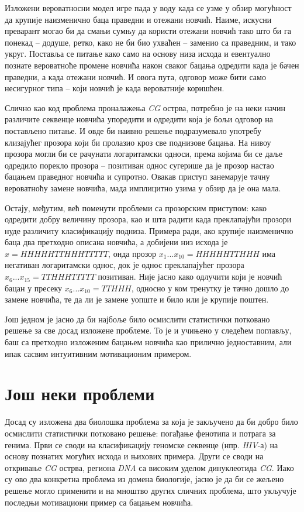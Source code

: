 \documentclass[12pt,oneside]{memoir}
\begin{document}
\begin{CJK}{UTF8}{ipxm}
Изложени вероватносни модел игре пада у воду када се узме у обзир могућност да крупије наизменично баца праведни и отежани новчић. Наиме, искусни преварант могао би да смањи сумњу да користи отежани новчић тако што би га понекад -- додуше, ретко, како не би био ухваћен -- заменио са праведним, и тако укруг. Поставља се питање како само на основу низа исхода и евентуално познате вероватноће промене новчића након сваког бацања одредити када је бачен праведни, а када отежани новчић. И овога пута, одговор може бити само несигурног типа -- који новчић је када вероватније коришћен.

Слично као код проблема проналажења \textit{CG} острва, потребно је на неки начин различите секвенце новчића упоредити и одредити која је бољи одговор на постављено питање. И овде би наивно решење подразумевало употребу клизајућег прозора који би пролазио кроз све поднизове бацања. На нивоу прозора могли би се рачунати логаритамски односи, према којима би се даље одредило порекло прозора -- позитиван однос сугерише да је прозор настао бацањем праведног новчића и супротно. Овакав приступ занемарује тачну вероватноћу замене новчића, мада имплицитно узима у обзир да је она мала.

Остају, међутим, већ поменути проблеми са прозорским приступом: како одредити добру величину прозора, као и шта радити када преклапајући прозори нуде различиту класификацију подниза. Примера ради, ако крупије наизменично баца два претходно описана новчића, а добијени низ исхода је $x = HHHHHTTHHHTTTTT$, онда прозор $x_1...x_{10} = HHHHHTTHHH$ има негативан логаритамски однос, док је однос преклапајућег прозора $x_6...x_{15} = TTHHHTTTTT$ позитиван. Није јасно како одлучити који је новчић бацан у пресеку $x_6...x_{10} = TTHHH$, односно у ком тренутку је тачно дошло до замене новчића, те да ли је замене уопште и било или је крупије поштен.

Још једном је јасно да би најбоље било осмислити статистички потковано решење за све досад изложене проблеме. То је и учињено у следећем поглављу, баш са претходно изложеним бацањем новчића као прилично једноставним, али ипак сасвим интуитивним мотивационим примером.

\section{Још неки проблеми}
Досад су изложена два биолошка проблема за која је закључено да би добро било осмислити статистички потковано решење: погађање фенотипа и потрага за генима. Први се своди на класификацију геномске секвенце (нпр. \textit{HIV}-а) на основу познатих могућих исхода и њихових примера. Други се своди на откривање \textit{CG} острва, региона \textit{DNA} са високим уделом динуклеотида \textit{CG}. Иако су ово два конкретна проблема из домена биологије, јасно је да би се жељено решење могло применити и на мноштво других сличних проблема, што укључује последњи мотивациони пример са бацањем новчића.


\end{CJK}
\end{document}
